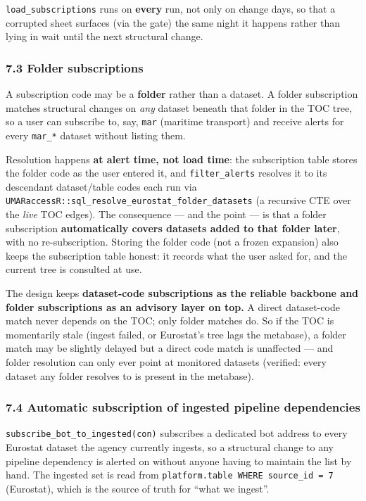 \documentclass[
]{article}
\begin{document}
\texttt{load\_subscriptions} runs on \textbf{every} run, not only on
change days, so that a corrupted sheet surfaces (via the gate) the same
night it happens rather than lying in wait until the next structural
change.

\subsubsection{7.3 Folder subscriptions}\label{folder-subscriptions}

A subscription code may be a \textbf{folder} rather than a dataset. A
folder subscription matches structural changes on \emph{any} dataset
beneath that folder in the TOC tree, so a user can subscribe to, say,
\texttt{mar} (maritime transport) and receive alerts for every
\texttt{mar\_*} dataset without listing them.

Resolution happens \textbf{at alert time, not load time}: the
subscription table stores the folder code as the user entered it, and
\texttt{filter\_alerts} resolves it to its descendant dataset/table
codes each run via
\texttt{UMARaccessR::sql\_resolve\_eurostat\_folder\_datasets} (a
recursive CTE over the \emph{live} TOC edges). The consequence --- and
the point --- is that a folder subscription \textbf{automatically covers
datasets added to that folder later}, with no re-subscription. Storing
the folder code (not a frozen expansion) also keeps the subscription
table honest: it records what the user asked for, and the current tree
is consulted at use.

The design keeps \textbf{dataset-code subscriptions as the reliable
backbone and folder subscriptions as an advisory layer on top.} A direct
dataset-code match never depends on the TOC; only folder matches do. So
if the TOC is momentarily stale (ingest failed, or Eurostat's tree lags
the metabase), a folder match may be slightly delayed but a direct code
match is unaffected --- and folder resolution can only ever point at
monitored datasets (verified: every dataset any folder resolves to is
present in the metabase).

\subsubsection{7.4 Automatic subscription of ingested pipeline
dependencies}\label{automatic-subscription-of-ingested-pipeline-dependencies}

\texttt{subscribe\_bot\_to\_ingested(con)} subscribes a dedicated bot
address to every Eurostat dataset the agency currently ingests, so a
structural change to any pipeline dependency is alerted on without
anyone having to maintain the list by hand. The ingested set is read
from \texttt{platform.table\ WHERE\ source\_id\ =\ 7} (Eurostat), which
is the source of truth for ``what we ingest''.
\end{document}
